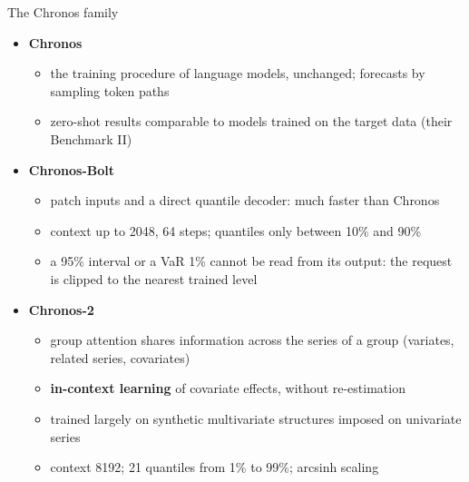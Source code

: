 \begin{frame}{The Chronos family}
\itemsize{\small}
\begin{itemize}
    \item \textbf{Chronos} 
    \begin{itemize}
        \item the training procedure of language models, unchanged; forecasts by sampling token paths
        \item zero-shot results comparable to models trained on the target data (their Benchmark II)
    \end{itemize}
    \item \textbf{Chronos-Bolt}
    \begin{itemize}
        \item patch inputs and a direct quantile decoder: much faster than Chronos
        \item context up to 2048, 64 steps; quantiles only between 10\% and 90\%
        \item a 95\% interval or a VaR 1\% cannot be read from its output: the request is clipped to the nearest trained level
    \end{itemize}
    \item \textbf{Chronos-2} 
    \begin{itemize}
        \item group attention shares information across the series of a group (variates, related series, covariates)
        \item \textbf{in-context learning} of covariate effects, without re-estimation
        \item trained largely on synthetic multivariate structures imposed on univariate series
        \item context 8192; 21 quantiles from 1\% to 99\%; arcsinh scaling
    \end{itemize}
\end{itemize}
\end{frame}

